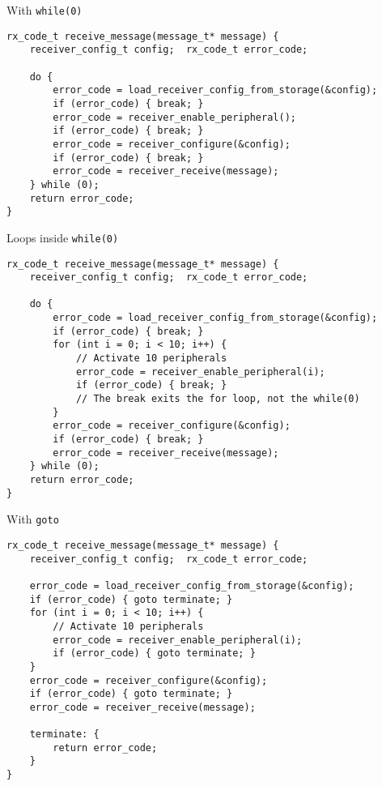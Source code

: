 \documentclass[aspectratio=169,14pt]{beamer}
\begin{document}
\begin{frame}[fragile]{With \texttt{while(0)}}
\begin{lstlisting}[style=cstyle]
rx_code_t receive_message(message_t* message) {
    receiver_config_t config;  rx_code_t error_code;
    
    do {
        error_code = load_receiver_config_from_storage(&config);
        if (error_code) { break; }
        error_code = receiver_enable_peripheral();
        if (error_code) { break; }
        error_code = receiver_configure(&config);
        if (error_code) { break; }
        error_code = receiver_receive(message);
    } while (0);
    return error_code;
}
\end{lstlisting}
\end{frame}

\begin{frame}[fragile]{Loops inside \texttt{while(0)}}
\begin{lstlisting}[style=cstyle]
rx_code_t receive_message(message_t* message) {
    receiver_config_t config;  rx_code_t error_code;
    
    do {
        error_code = load_receiver_config_from_storage(&config);
        if (error_code) { break; }
        for (int i = 0; i < 10; i++) {
            // Activate 10 peripherals
            error_code = receiver_enable_peripheral(i);
            if (error_code) { break; }
            // The break exits the for loop, not the while(0)
        }
        error_code = receiver_configure(&config);
        if (error_code) { break; }
        error_code = receiver_receive(message);
    } while (0);
    return error_code;
}
\end{lstlisting}
\end{frame}


\begin{frame}[fragile]{With \texttt{goto}}
\begin{lstlisting}[style=cstyle]
rx_code_t receive_message(message_t* message) {
    receiver_config_t config;  rx_code_t error_code;
    
    error_code = load_receiver_config_from_storage(&config);
    if (error_code) { goto terminate; }
    for (int i = 0; i < 10; i++) {
        // Activate 10 peripherals
        error_code = receiver_enable_peripheral(i);
        if (error_code) { goto terminate; }
    }
    error_code = receiver_configure(&config);
    if (error_code) { goto terminate; }
    error_code = receiver_receive(message);
    
    terminate: {
        return error_code;
    }
}
\end{lstlisting}
\end{frame}
\end{document}
